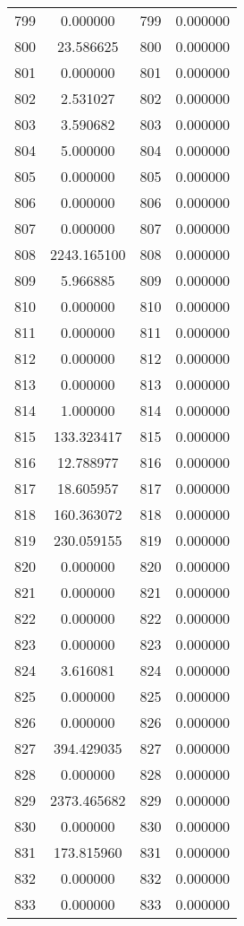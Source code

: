 \documentclass[12pt]{article}
\begin{document}
\begin{longtable}{@{}cccc@{}}
799 & 0.000000 & 799 & 0.000000 \\
800 & 23.586625 & 800 & 0.000000 \\
801 & 0.000000 & 801 & 0.000000 \\
802 & 2.531027 & 802 & 0.000000 \\
803 & 3.590682 & 803 & 0.000000 \\
804 & 5.000000 & 804 & 0.000000 \\
805 & 0.000000 & 805 & 0.000000 \\
806 & 0.000000 & 806 & 0.000000 \\
807 & 0.000000 & 807 & 0.000000 \\
808 & 2243.165100 & 808 & 0.000000 \\
809 & 5.966885 & 809 & 0.000000 \\
810 & 0.000000 & 810 & 0.000000 \\
811 & 0.000000 & 811 & 0.000000 \\
812 & 0.000000 & 812 & 0.000000 \\
813 & 0.000000 & 813 & 0.000000 \\
814 & 1.000000 & 814 & 0.000000 \\
815 & 133.323417 & 815 & 0.000000 \\
816 & 12.788977 & 816 & 0.000000 \\
817 & 18.605957 & 817 & 0.000000 \\
818 & 160.363072 & 818 & 0.000000 \\
819 & 230.059155 & 819 & 0.000000 \\
820 & 0.000000 & 820 & 0.000000 \\
821 & 0.000000 & 821 & 0.000000 \\
822 & 0.000000 & 822 & 0.000000 \\
823 & 0.000000 & 823 & 0.000000 \\
824 & 3.616081 & 824 & 0.000000 \\
825 & 0.000000 & 825 & 0.000000 \\
826 & 0.000000 & 826 & 0.000000 \\
827 & 394.429035 & 827 & 0.000000 \\
828 & 0.000000 & 828 & 0.000000 \\
829 & 2373.465682 & 829 & 0.000000 \\
830 & 0.000000 & 830 & 0.000000 \\
831 & 173.815960 & 831 & 0.000000 \\
832 & 0.000000 & 832 & 0.000000 \\
833 & 0.000000 & 833 & 0.000000 \\

\end{longtable}
\end{document}
